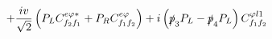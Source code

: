 %
\begin{dmath*}
%
  +  \frac{i v}{\sqrt{2}} \left(P_L C^{e \varphi  *}_{f_2 f_1} + P_R C^{e \varphi  }_{f_1 f_2}\right)  +  i\left(\slashed{p}_{3} P_L - \slashed{p}_{4} P_L\right) C^{ \varphi  l1}_{f_1 f_2}
%
\end{dmath*}
%
